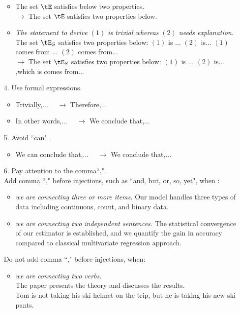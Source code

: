 \documentclass[11pt]{article}
\theoremstyle{plain}
\theoremstyle{definition}
\begin{document}
\begin{enumerate}
\begin{itemize}
        \item The set $\tE$ satisfies below two properties. \\
        $ \rightarrow$ The set $\tE$ satisfies two properties below.
        \item \textit{The statement to derive $(1)$ is trivial whereas $(2)$ needs explanation.}\\
        The set $\tE_{S}$ satisfies two properties below: $(1)$ is ... $(2)$ is... $(1)$ comes from ... $(2)$ comes from...\\
        $\rightarrow$ The set $\tE_{S}$ satisfies two properties below: $(1)$ is ... $(2)$ is... ,which is comes from...
    \end{itemize}
    \item[4.] Use formal expressions. 
    \begin{itemize}
        \item Trivially,... $\quad \rightarrow $ Therefore,...
        \item In other words,...  $\quad \rightarrow $ We conclude that,...
    \end{itemize}
    \item[5.] Avoid ``can". 
    \begin{itemize}
        \item We can conclude that,...  $\quad \rightarrow $ We conclude that,...
    \end{itemize}
    \item[6.] Pay attention to the comma``,". \\
    Add comma ``," before injections, such as ``and, but, or, so, yet", when : 
    \begin{itemize}
    	\item \textit{we are connecting three or more items.} Our model handles three types of data including continuous, count, and binary data.
    	\item \textit{we are connecting two independent sentences.} The statistical convergence of our estimator is established, and we quantify the gain in accuracy compared to classical multivariate regression approach.
    \end{itemize}
    Do not add comma ``," before injections, when:
    \begin{itemize}
    	\item \textit{ we are connecting two verbs.} \\
    	The paper presents the theory and discusses the results.\\
    	Tom is not taking his ski helmet on the trip, but he is taking his new ski pants.\\

\end{itemize}
\end{enumerate}
\end{document}
